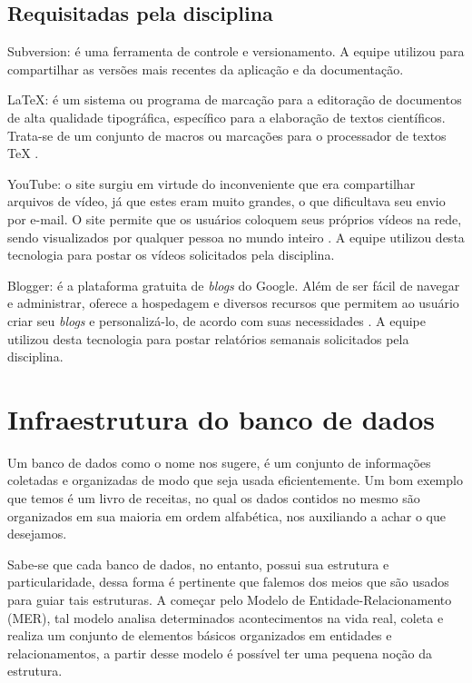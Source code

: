 \subsection{Requisitadas pela disciplina}
Subversion: é uma ferramenta de controle e versionamento. A equipe utilizou para compartilhar as versões mais recentes da aplicação e da documentação.

\LaTeX:  é um sistema ou programa de marcação para a editoração de documentos de alta qualidade tipográfica, específico para a elaboração de textos científicos. Trata-se de um conjunto de macros ou marcações para o processador de textos TeX \cite{latex}.

YouTube: o site surgiu em virtude do inconveniente que era compartilhar arquivos de vídeo, já que estes eram muito grandes, o que dificultava seu envio por e-mail. O site permite que os usuários coloquem seus próprios vídeos na rede, sendo visualizados por qualquer pessoa no mundo inteiro \cite{youtube}. A equipe utilizou desta tecnologia para postar os vídeos solicitados pela disciplina.

Blogger: é a plataforma gratuita de \textit{blogs} do Google. Além de ser fácil de navegar e administrar, oferece a hospedagem e diversos recursos que permitem ao usuário criar seu \textit{blogs} e personalizá-lo, de acordo com suas necessidades \cite{blogger}. A equipe utilizou desta tecnologia para postar relatórios semanais  solicitados pela disciplina.

\section{Infraestrutura do banco de dados}
Um banco de dados como o nome nos sugere, é um conjunto de informações coletadas e organizadas de modo que seja usada eficientemente. Um bom exemplo que temos é um livro de receitas, no qual os dados contidos no mesmo são organizados em sua maioria em ordem alfabética, nos auxiliando a achar o que desejamos.

Sabe-se que cada banco de dados, no entanto, possui sua estrutura e particularidade, dessa forma é pertinente que falemos dos meios que são usados para guiar tais estruturas. A começar pelo Modelo de Entidade-Relacionamento (MER), tal modelo analisa determinados acontecimentos na vida real, coleta e realiza um conjunto de elementos básicos organizados em entidades e relacionamentos, a partir desse modelo é possível ter uma pequena noção da estrutura.

